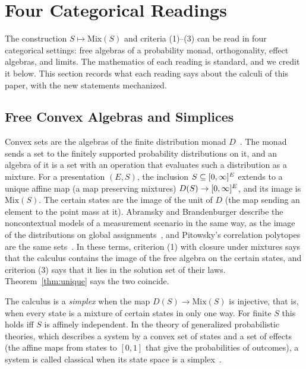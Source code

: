 \section{Four Categorical Readings}
\label{sec:categorical}

The construction $S \mapsto \mathrm{Mix}(S)$ and criteria (1)--(3) can be
read in four categorical settings: free algebras of a probability monad,
orthogonality, effect algebras, and limits. The mathematics of each
reading is standard, and we credit it below. This section records what
each reading says about the calculi of this paper, with the new
statements mechanized.

\subsection{Free Convex Algebras and Simplices}
\label{sec:cat-simplex}

Convex sets are the algebras of the finite distribution monad
$D$~\cite{swirszcz1974,fritz2009,jacobs2011}. The monad sends a set to
the finitely supported probability distributions on it, and an algebra
of it is a set with an operation that evaluates such a distribution as a
mixture. For a presentation $(E, S)$, the inclusion
$S \subseteq [0,\infty]^{E}$ extends to a unique affine map (a map
preserving mixtures) $D(S) \to [0,\infty]^{E}$, and its image is
$\mathrm{Mix}(S)$. The certain states are the image of the unit of $D$
(the map sending an element to the point mass at it). Abramsky and Brandenburger
describe the noncontextual models of a measurement scenario in the same
way, as the image of the distributions on global
assignments~\cite{abramsky-brandenburger2011}, and Pitowsky's
correlation polytopes are the same sets~\cite{pitowsky1991}. In these
terms, criterion (1) with closure under mixtures says that the calculus
contains the image of the free algebra on the certain states, and
criterion (3) says that it lies in the solution set of their laws.
Theorem~\ref{thm:unique} says the two coincide.

The calculus is a \emph{simplex} when the map $D(S) \to \mathrm{Mix}(S)$
is injective, that is, when every state is a mixture of certain states in
only one way. For finite $S$ this holds iff $S$ is affinely independent.
In the theory of generalized probabilistic theories, which describes a
system by a convex set of states and a set of effects (the affine maps
from states to $[0,1]$ that give the probabilities of outcomes), a system
is called classical when its state space is a simplex~\cite{barrett2007,plavala2023}.

